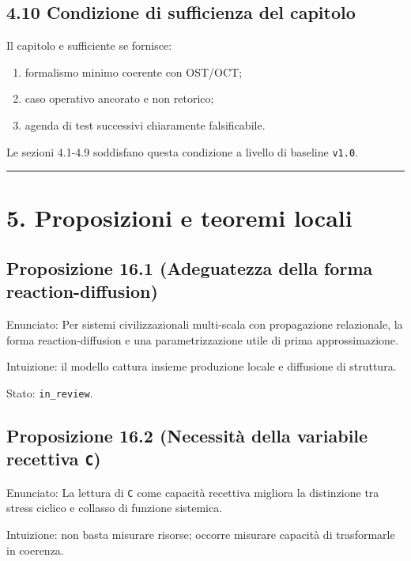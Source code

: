 \subsection{4.10 Condizione di sufficienza del capitolo}

Il capitolo e sufficiente se fornisce:

\begin{enumerate}
\def\labelenumi{\arabic{enumi}.}
\tightlist
\item
  formalismo minimo coerente con OST/OCT;
\item
  caso operativo ancorato e non retorico;
\item
  agenda di test successivi chiaramente falsificabile.
\end{enumerate}

Le sezioni 4.1-4.9 soddisfano questa condizione a livello di baseline \texttt{v1.0}.

\begin{center}\rule{0.5\linewidth}{0.5pt}\end{center}

\section{5. Proposizioni e teoremi locali}

\subsection{Proposizione 16.1 (Adeguatezza della forma reaction-diffusion)}

Enunciato:
Per sistemi civilizzazionali multi-scala con propagazione relazionale, la forma reaction-diffusion e una parametrizzazione utile di prima approssimazione.

Intuizione:
il modello cattura insieme produzione locale e diffusione di struttura.

Stato: \texttt{in\_review}.

\subsection{\texorpdfstring{Proposizione 16.2 (Necessità della variabile recettiva \texttt{C})}{Proposizione 16.2 (Necessità della variabile recettiva C)}}

Enunciato:
La lettura di \texttt{C} come capacità recettiva migliora la distinzione tra stress ciclico e collasso di funzione sistemica.

Intuizione:
non basta misurare risorse; occorre misurare capacità di trasformarle in coerenza.

